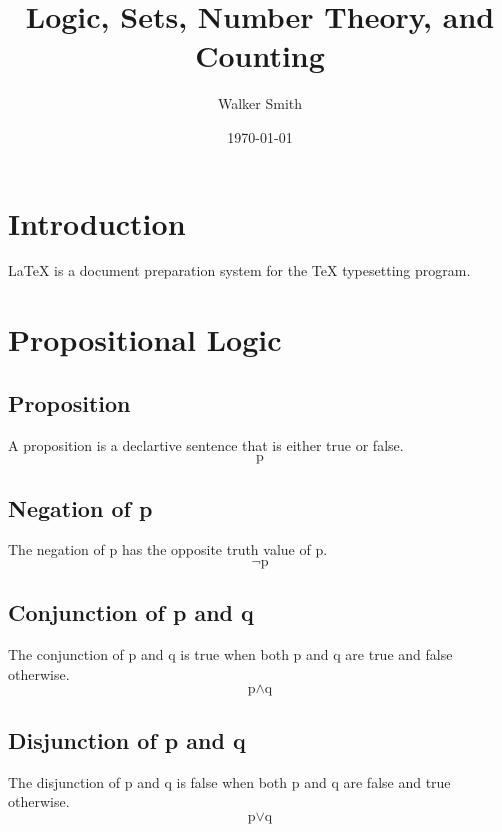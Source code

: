\documentclass[12pt]{article}
\title{Logic, Sets, Number Theory, and Counting}
\date{\today}
\author{Walker Smith}
\begin{document}
\maketitle
\pagebreak

\tableofcontents{}
\pagebreak

%
%
%
%
\section{Introduction}
\LaTeX{} is 
a 
document
preparation
system
for
the
\TeX{}
typesetting
program.

%
%
%
%
%
%
\pagebreak
\section{Propositional Logic}

\subsection{Proposition}
A proposition is a declartive sentence 
that is either true or false.
\begin{equation}
\mbox{p}
\end{equation}

\subsection{Negation of p}
The negation of p 
has the opposite truth value of p.
\begin{equation}
\neg \mbox{p}
\end{equation}

\subsection{Conjunction of p and q}
The conjunction of p and q
is true
when
both p and q are true
and false otherwise.
\begin{equation}
\mbox{p} \wedge \mbox{q}
\end{equation}

\subsection{Disjunction of p and q}
The disjunction of p and q
is false
when
both p and q are false
and true otherwise.
\begin{equation}
\mbox{p} \lor \mbox{q}
\end{equation}
\end{document}
